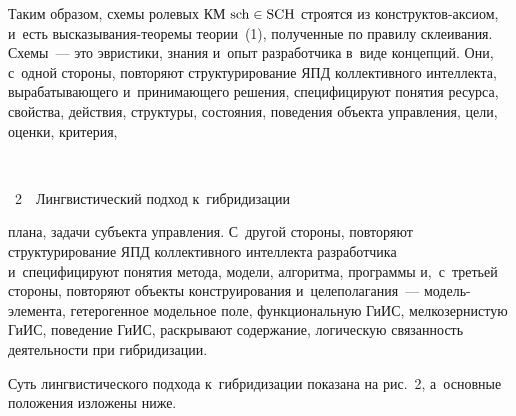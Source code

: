 \begin{multicols}{2}
  Таким образом, схемы ролевых КМ $\mathrm{sch}\hm\in \mathrm{SCH}$ строятся из  
кон\-струк\-тов-ак\-си\-ом, и~есть вы\-ска\-зы\-ва\-ния-тео\-ре\-мы теории~(1), полученные по 
правилу склеивания. Схемы~--- это эвристики, знания и~опыт
 разработчика в~виде 
концепций. Они, с~одной стороны, повторяют структурирование ЯПД коллективного 
интеллекта, вырабатывающего и~принимающего решения, специфицируют понятия ресурса,
свойства, действия, структуры, состояния, поведения объекта управ\-ле\-ния, цели, оценки, 
критерия,\linebreak\vspace*{-12pt}

\columnbreak

\begin{center}  %
\vspace*{-1pt}
 \mbox{%
 \epsfxsize=76.312mm
 }



\vspace*{6pt}

\noindent
{{\figurename~2}\ \ \small{Лингвистический подход к~гибридизации}}

\end{center}

 \vspace*{6pt}

\noindent
 плана, задачи субъекта управ\-ле\-ния. С~другой стороны, повторяют 
структурирование ЯПД коллективного интеллекта разработчика и~специфицируют понятия 
метода, модели, алгоритма, программы и,~с~третьей стороны, повторяют объекты 
конструирования и~целеполагания~--- мо\-дель-эле\-мен\-та, гетерогенное модельное поле, 
функциональную ГиИС, мелкозернистую ГиИС, поведение ГиИС, раскрывают содержание, 
логическую связанность деятельности при гибридизации.
  
  Суть лингвистического подхода к~гибридизации показана на рис.~2, а~основные 
положения изложены ниже.
  


\end{multicols}
